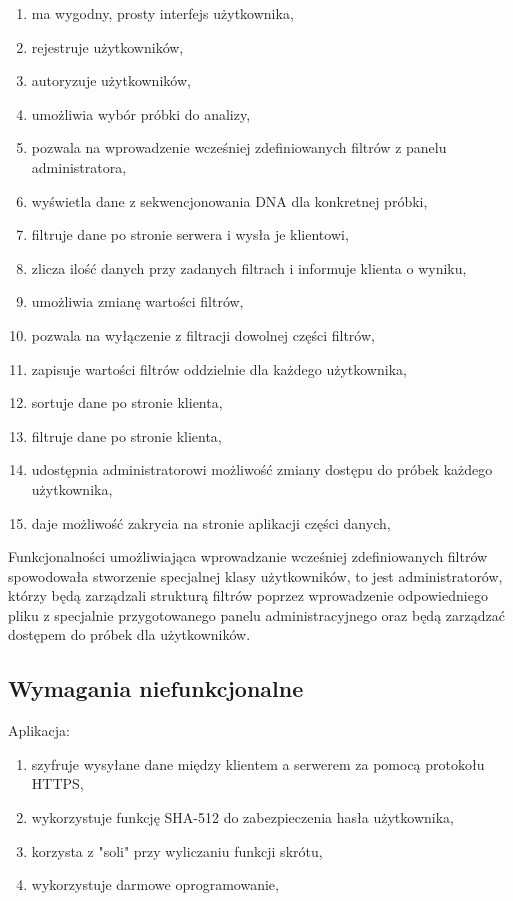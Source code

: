 \documentclass[a4paper,12pt,twoside]{article}
\begin{document}
 \begin{enumerate}[1)]
 \item ma wygodny, prosty interfejs użytkownika,
 \item rejestruje użytkowników,
 \item autoryzuje użytkowników,
 \item umożliwia wybór próbki do analizy,
 \item pozwala na wprowadzenie wcześniej zdefiniowanych filtrów z panelu administratora,
 \item wyświetla dane z sekwencjonowania DNA dla konkretnej próbki,
 \item filtruje dane po stronie serwera i wysła je klientowi,
 \item zlicza ilość danych przy zadanych filtrach i informuje klienta o wyniku,
 \item umożliwia zmianę wartości filtrów,
 \item pozwala na wyłączenie z filtracji dowolnej części filtrów,
 \item zapisuje wartości filtrów oddzielnie dla każdego użytkownika,
 \item sortuje dane po stronie klienta,
 \item filtruje dane po stronie klienta,
 \item udostępnia administratorowi możliwość zmiany dostępu do próbek 
 każdego użytkownika,
 \item daje możliwość zakrycia na stronie aplikacji części danych,	
 \end{enumerate}
 
\newpage

Funkcjonalności umożliwiająca wprowadzanie wcześniej zdefiniowanych filtrów spowodowała stworzenie
specjalnej klasy użytkowników, to jest administratorów, którzy będą zarządzali strukturą filtrów poprzez wprowadzenie odpowiedniego pliku z specjalnie przygotowanego panelu administracyjnego
oraz będą zarządzać dostępem do próbek dla użytkowników.

\subsection{Wymagania niefunkcjonalne}
Aplikacja:
 \begin{enumerate}[1)]
  \item szyfruje wysyłane dane między klientem a serwerem za pomocą protokołu HTTPS,
  \item wykorzystuje funkcję SHA-512 do zabezpieczenia hasła użytkownika,
  \item korzysta z "soli" przy wyliczaniu funkcji skrótu,
  \item wykorzystuje darmowe oprogramowanie,
 \end{enumerate}
\end{document}
